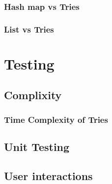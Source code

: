 \documentclass[10pt]{article} %
\begin{document}
			\subsubsection{Hash map vs Tries}
			\subsubsection{List vs Tries}
	\section{Testing}
		\subsection{Complixity}
			\subsubsection{Time Complexity of Tries}
				

				
		\subsection{Unit Testing}
		\subsection{User interactions}
		
	\newpage
	\printbibliography
	\newpage
	
\end{document}
